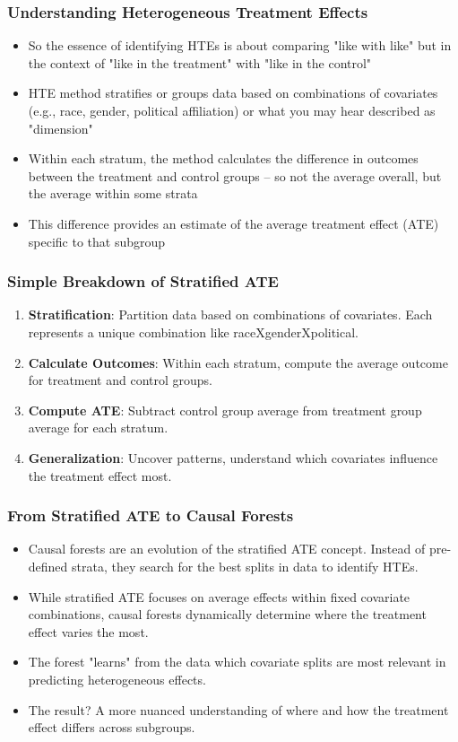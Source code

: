 \documentclass{beamer}
\begin{document}
\begin{frame}
\frametitle{Understanding Heterogeneous Treatment Effects}
\begin{itemize}
    \item So the essence of identifying HTEs is about comparing "like with like" but in the context of "like in the treatment" with "like in the control"
    \item HTE method stratifies or groups data based on combinations of covariates (e.g., race, gender, political affiliation) or what you may hear described as "dimension"
    \item Within each stratum, the method calculates the difference in outcomes between the treatment and control groups -- so not the average overall, but the average within some strata
    \item This difference provides an estimate of the average treatment effect (ATE) specific to that subgroup
\end{itemize}
\end{frame}

\begin{frame}
\frametitle{Simple Breakdown of Stratified ATE}
\begin{enumerate}
    \item \textbf{Stratification}: Partition data based on combinations of covariates. Each represents a unique combination like raceXgenderXpolitical.
    \item \textbf{Calculate Outcomes}: Within each stratum, compute the average outcome for treatment and control groups.
    \item \textbf{Compute ATE}: Subtract control group average from treatment group average for each stratum.
    \item \textbf{Generalization}: Uncover patterns, understand which covariates influence the treatment effect most.
\end{enumerate}
\end{frame}


\begin{frame}
\frametitle{From Stratified ATE to Causal Forests}
\begin{itemize}
    \item Causal forests are an evolution of the stratified ATE concept. Instead of pre-defined strata, they search for the best splits in data to identify HTEs.
    \bigskip
    \item While stratified ATE focuses on average effects within fixed covariate combinations, causal forests dynamically determine where the treatment effect varies the most.
    \bigskip
    \item The forest "learns" from the data which covariate splits are most relevant in predicting heterogeneous effects.
    \bigskip
    \item The result? A more nuanced understanding of where and how the treatment effect differs across subgroups.
\end{itemize}
\end{frame}
\end{document}
